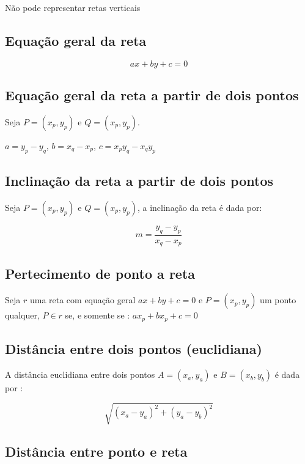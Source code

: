 Não pode representar retas verticais

\subsection{Equação geral da reta}

\begin{equation}
    ax + by + c = 0
\end{equation}

\subsection{Equação geral da reta a partir de dois pontos}

Seja $P = (x_p, y_p)$ e $Q = (x_p, y_p)$.

$a = y_p - y_q$, $b = x_q-x_p$, $c = x_p y_q - x_q y_p$


\subsection{Inclinação da reta a partir de dois pontos}

Seja $P = (x_p, y_p)$ e $Q = (x_p, y_p)$, a inclinação da reta é dada por:

\begin{equation}
    m = \frac{y_q - y_p}{x_q - x_p}
\end{equation}

\subsection{Pertecimento de ponto a reta}

Seja $r$ uma reta com equação geral $ax + by + c = 0$ e $P = (x_p, y_p) $ um ponto qualquer, $P \in r$ se, e somente se : $a x_p + b x_p + c = 0$

\subsection{Distância entre dois pontos (euclidiana)}

A distância euclidiana entre dois pontos $A = (x_a, y_a)$ e $B = (x_b, y_b)$ é dada por :

$$ \sqrt{(x_a-y_a)^2 + (y_a-y_b)^2} $$

\subsection{Distância entre ponto e reta}

